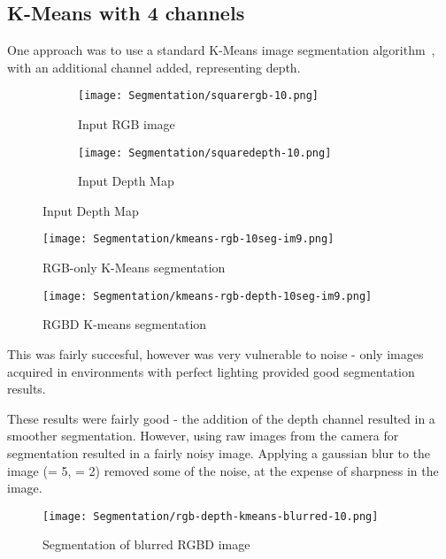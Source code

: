 \subsection{K-Means with 4 channels}
One approach was to use a standard K-Means image segmentation algorithm~\cite{kmeans-matlab}, with an additional channel added, representing depth. 
\begin{figure}
    \centering

    \begin{subfigure}[b]{0.5\textwidth}
        \centering
        \texttt{[image: Segmentation/squarergb-10.png]}
        \caption{Input RGB image}
    \end{subfigure}

    \hfill

    \begin{subfigure}[b]{0.5\textwidth}
        \centering
        \texttt{[image: Segmentation/squaredepth-10.png]}
        \caption{Input Depth Map}
    \end{subfigure}
\end{figure}

\begin{figure}[H]
\centering
\texttt{[image: Segmentation/kmeans-rgb-10seg-im9.png]}
\caption{RGB-only K-Means segmentation}
\end{figure}

\begin{figure}[H]
\centering
\texttt{[image: Segmentation/kmeans-rgb-depth-10seg-im9.png]}
\caption{RGBD K-means segmentation}
\end{figure}

This was fairly succesful, however was very vulnerable to noise - only images acquired in environments with perfect lighting provided good segmentation results. 

These results were fairly good - the addition of the depth channel resulted in a smoother segmentation. However, using raw images from the camera for segmentation resulted in a fairly noisy image. Applying a gaussian blur to the image (\diameter = 5, \sigma = 2) removed some of the noise, at the expense of sharpness in the image.

\begin{figure}[H]
\centering
\texttt{[image: Segmentation/rgb-depth-kmeans-blurred-10.png]}
\caption{Segmentation of blurred RGBD image}
\end{figure}

